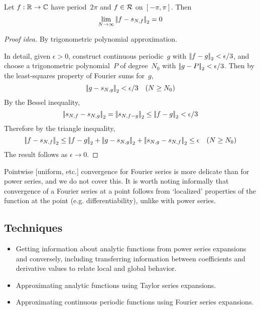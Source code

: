 \begin{thm}
Let \(f:\mathbb{R}\to\mathbb{C}\) have period~\(2\pi\) and \(f\in\mathcal{R}\) on \([-\pi,\pi]\). Then
\[\lim_{N\to\infty}\left|\!\left|{f-s_{N,f}}\right|\!\right|_2=0\]
\end{thm}
\begin{proof}[Proof idea]
By trigonometric polynomial approximation.

In detail, given \(\epsilon>0\), construct continuous periodic~\(g\) with \(\left|\!\left|{f-g}\right|\!\right|_2<\epsilon/3\), and choose a trigonometric polynomial~\(P\) of degree~\(N_0\) with \(\left|\!\left|{g-P}\right|\!\right|_2<\epsilon/3\). Then by the least-squares property of Fourier sums for~\(g\),
\[\left|\!\left|{g-s_{N,g}}\right|\!\right|_2<\epsilon/3\quad(N\ge N_0)\]
By the Bessel inequality,
\[\left|\!\left|{s_{N,f}-s_{N,g}}\right|\!\right|_2=\left|\!\left|{s_{N,f-g}}\right|\!\right|_2\le\left|\!\left|{f-g}\right|\!\right|_2<\epsilon/3\]
Therefore by the triangle inequality,
\[\lsnorm{f-s_{N,f}}\le\lsnorm{f-g}+\lsnorm{g-s_{N,g}}+\lsnorm{s_{N,g}-s_{N,f}}\le\epsilon\quad(N\ge N_0)\]
The result follows as \(\epsilon\to0\).
\end{proof}

\begin{rmk}
Pointwise [uniform, etc.] convergence for Fourier series is more delicate than for power series, and we do not cover this. It is worth noting informally that convergence of a Fourier series at a point follows from `localized' properties of the function at the point (e.g. differentiability), unlike with power series.
\end{rmk}

\subsection*{Techniques}
\begin{itemize}[itemsep=0pt]
\item Getting information about analytic functions from power series expansions and conversely, including transferring information between coefficients and derivative values to relate local and global behavior.
\item Approximating analytic functions using Taylor series expansions.
\item Approximating continuous periodic functions using Fourier series expansions.
\end{itemize}

